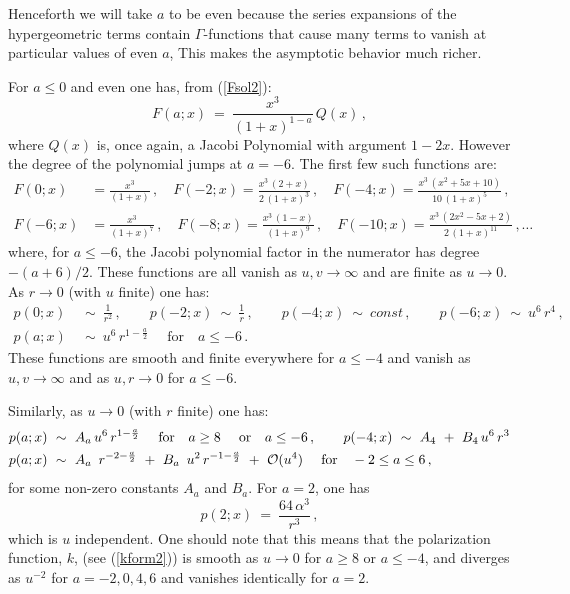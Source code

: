 \documentclass[11pt]{article}
\def\cO{{\cal O}}
\numberwithin{equation}{section}
\begin{document}
Henceforth we will take $a$ to be even because the series expansions of the hypergeometric terms contain $\Gamma$-functions that cause  many terms to vanish at particular values of even $a$,  This makes the asymptotic behavior much richer.


For $a \le 0$ and even one has, from (\ref{Fsol2}):
%
\begin{equation}
F(a;x)    ~=~\frac{x^3 }{(1+x)^{1-a}} \, Q(x)\,,
\label{Fsol3}
\end{equation}
%
where $Q(x)$ is, once again, a Jacobi Polynomial with argument $1- 2x$. However the degree of the polynomial jumps at $a= -6$.  The first few such functions are:
%
\begin{equation}
\begin{aligned}
F(0;x)  & =\frac{x^3 }{(1+x)} \,, \quad F(-2;x)    =\frac{x^3\,(2+x) }{2\,(1+x)^3} \,, \quad F(-4;x)    =\frac{x^3\,(x^2 +5x +10) }{10\,(1+x)^5} \,, \\ 
 F(-6;x)   & =\frac{x^3}{(1+x)^7}  \,, \quad F(-8;x)   =\frac{x^3\,(1-x) }{(1+x)^9}  \,, \quad F(-10;x)=\frac{x^3\,(2x^2 - 5x +2) }{2 \, (1+x)^{11}} \,, \dots 
\end{aligned}
\label{psol2}
\end{equation}
%
where, for $a \le -6$, the Jacobi polynomial factor in the numerator has degree $-(a+6)/2$.  These functions are all vanish as $u,v \to \infty$ and are finite as $ u \to 0$. As $r \to 0$ (with $u$ finite) one has:
%
\begin{equation}
\begin{aligned}
p(0;x)  & ~\sim~  \frac{1}{r^2} \,, \qquad p(-2;x)   ~\sim~  \frac{1}{r}  \,, \qquad p(-4;x)    ~\sim~  const \,, \qquad  p(-6;x)   ~\sim~ u^6 \, r^4  \,, \\ 
 p(a;x)   & ~\sim~ u^6 \, r^{1- \frac{a}{2}} \quad  \text{ for} \quad a \le -6 \,.
\end{aligned}
\label{pasymp}
\end{equation}
%
These functions are smooth and finite everywhere for $a \le -4$ and  vanish as $u,v \to \infty$ and as $ u, r \to 0$ for $a \le -6$.

Similarly, as $u \to 0$ (with $r$ finite) one has:
%
\begin{equation}
\begin{aligned}
p(a;x)  & ~\sim~   A_a \, u^6  \, r^{1- \frac{a}{2}}  \quad  \text{ for} \quad a \ge 8\quad  \text{ or} \quad a \le -6 \,,   \qquad   p(-4;x)  ~\sim~   A_4~+~ B_4 \, u^6  \, r^3   \\
 p(a;x)  & ~\sim~ A_a \ \, r^{-2- \frac{a}{2}} ~+~ B_a \ \, u^2 \, r^{-1- \frac{a}{2}} ~+~\cO(u^4)  \quad  \text{ for} \quad -2 \le a \le  6 \,,
\end{aligned}
\label{pasymp}
\end{equation} 
%
for some non-zero constants $A_a$ and $B_a$.  For $a=2$, one has
%
\begin{equation}
p(2; x)  ~=~ \frac{64\, \alpha^3} {r^3}    \,,
\label{peql2}
\end{equation}
%
which is $u$ independent.  One should note that this means that the polarization function, $k$, (see (\ref{kform2})) is smooth 
as $u \to 0$ for $a  \ge 8$ or  $a \le -4$, and diverges as $u^{-2}$ for $a=-2,0,4,6$ and vanishes identically for $a=2$.
  
\end{document}
